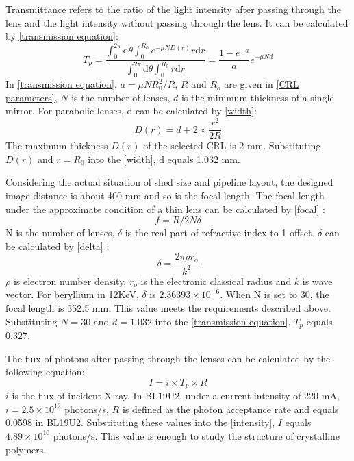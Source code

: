 \documentclass{Head}
\begin{document}
Transmittance refers to the ratio of the light intensity after passing through the lens and the light intensity without passing through the lens.
It can be calculated by \autoref{transmission equation}\cite{Lengeler:ht2006}:
\begin{equation}
    T_p=\frac{\int_0^{2\pi}\mathrm{d}\theta\int_0^{R_0}e^{-\mu ND(r)}r\mathrm{d}r}{\int_0^{2\pi}\mathrm{d}\theta\int_0^{R_0}r\mathrm{d}r}=\frac{1-e^{-a}}{a}e^{-\mu Nd}
    \label{transmission equation}
\end{equation}
In \autoref{transmission equation}, $a=\mu N R_0^2/R$, $R$ and $R_o$ are given in \autoref{CRL parameters}, $N$ is the number of lenses, $d$ is the minimum thickness of a single mirror.
For parabolic lenses, d can be calculated by \autoref{width}:
\begin{equation}
    D(r)=d+2\times \frac{r^2}{2R}
    \label{width}
\end{equation}
The maximum thickness $D(r)$ of the selected CRL is 2 mm.
Substituting $D(r)$ and $r=R_0$ into the \autoref{width}, d equals 1.032 mm.



Considering the actual situation of shed size and pipeline layout, the designed image distance is about 400 mm and so is the focal length.
The focal length under the approximate condition of a thin lens can be calculated by \autoref{focal} :
\begin{equation}
    f=R/2N\delta
    \label{focal}
\end{equation}
N is the number of lenses, $\delta$ is the real part of refractive index to 1 offset.
$\delta$ can be calculated by \autoref{delta} \cite{als2011elements}:
\begin{equation}
    \delta=\frac{2\pi\rho r_o}{k^2}
    \label{delta}
\end{equation}
$\rho$ is electron number density, $r_o$ is the electronic classical radius and $k$ is wave vector.
For beryllium in 12KeV, $\delta$ is $2.36393\times 10^{-6}$.
When N is set to 30, the focal length is 352.5 mm.
This value meets the requirements described above.
Substituting $N=30$ and $d=1.032$ into the \autoref{transmission equation}, $T_p$ equals 0.327.


The flux of photons after passing through the lenses can be calculated by the following equation:
\begin{equation}
    I=i\times T_p \times R
    \label{intensity}
\end{equation}
$i$ is the flux of incident X-ray.
In BL19U2, under a current intensity of 220 mA, $i=2.5\times 10^{12}$ photons/s, $R$ is defined as the photon acceptance rate and equals 0.0598 in BL19U2.
Substituting these values into the \autoref{intensity}, $I$ equals $4.89\times 10^{10}$ photons/s. This value is enough to study the structure of crystalline polymers.
\end{document}

